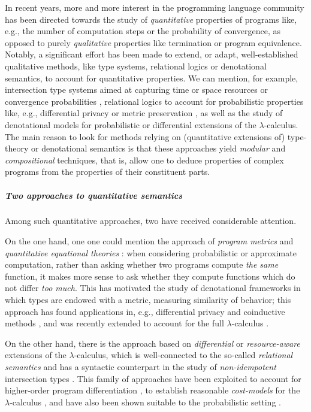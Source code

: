 
In recent years, more and more interest in the programming language community has been directed towards the study of \emph{quantitative} properties of programs like, e.g., the number of computation steps or the probability of convergence, 
as opposed to purely \emph{qualitative} properties like termination or program equivalence. 
Notably, a significant effort has been made to extend, or adapt, well-established qualitative methods, like type systems, relational logics or denotational semantics, to account for quantitative properties. We can mention, for example, 
intersection type systems aimed at capturing time or space resources \cite{decarvalho2018, Accattoli2022} or convergence probabilities \cite{Breuvart2018, PistoneLICS2022},  relational logics to account for probabilistic properties like, e.g., differential privacy \cite{Barthe_2012} or metric preservation \cite{Reed2010, dallago}, as well as the study of denotational models for 
probabilistic \cite{Ehrhard2011, Staton2017} or differential \cite{difflambda} extensions of the $\lambda$-calculus. 
The main reason to look for methods relying on (quantitative extensions of) type-theory or denotational semantics is that these approaches yield \emph{modular} and \emph{compositional} techniques, that is, allow one to deduce properties of complex programs from the properties of their constituent parts.   

\subparagraph*{Two approaches to quantitative semantics}

Among such quantitative approaches, two have received considerable attention.

On the one hand, one one could mention the approach of \emph{program metrics} \cite{Reed2010, Gaboardi2017, Gabo2019} and \emph{quantitative equational theories} \cite{Plotk}: when considering probabilistic or approximate computation, rather than asking whether two programs compute \emph{the same} function, it makes more sense to ask   whether they compute functions which do not differ \emph{too much}. This has motivated the study of denotational frameworks in which types are endowed with a metric, measuring similarity of behavior; this approach has found  applications in, e.g., differential privacy \cite{Reed2010} and coinductive methods \cite{Bonchi2018}, and was recently extended to account for the full $\lambda$-calculus \cite{Geoffroy2020, PistoneLICS, PistoneFSCD2022}.

On the other hand, there is the approach based on \emph{differential} \cite{difflambda} or \emph{resource-aware} \cite{Boudol1993} extensions of the $\lambda$-calculus, which is well-connected to the so-called \emph{relational semantics} \cite{Manzo2012, Manzo2013, dill} and has a syntactic counterpart in the study of \emph{non-idempotent} intersection types \cite{decarvalho2018, Mazza2016}. This family of approaches have been exploited to account for higher-order program differentiation \cite{difflambda}, to establish reasonable \emph{cost-models} for the $\lambda$-calculus \cite{Accattoli2021}, and have also been shown suitable to the probabilistic setting \cite{Manzo2013, Breuvart2018, PistoneLICS2022}. 


